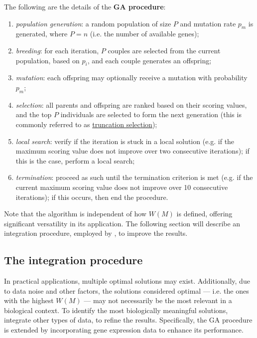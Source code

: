 \begin{definition}[GA procedure]
    The following are the details of the \textbf{GA procedure}:

    \begin{enumerate}
        \item \textit{population generation}: a random population of size $P$ and mutation rate $p_m$ is generated, where $P = n$ (i.e. the number of available genes);
        \item \textit{breeding}: for each iteration, $P$ couples are selected from the current population, based on $p_i$, and each couple generates an offspring;
        \item \textit{mutation}: each offspring may optionally receive a mutation with probability $p_m$;
        \item \textit{selection}: all parents and offspring are ranked based on their scoring values, and the top $P$ individuals are selected to form the next generation (this is commonly referred to as \href{https://en.wikipedia.org/wiki/Truncation_selection}{truncation selection});
        \item \textit{local search}: verify if the iteration is stuck in a local solution (e.g. if the maximum scoring value does not improve over two consecutive iterations); if this is the case, perform a local search;
        \item \textit{termination}: proceed as such until the termination criterion is met (e.g. if the current maximum scoring value does not improve over 10 consecutive iterations); if this occurs, then end the procedure.
    \end{enumerate}
\end{definition}

Note that the algorithm is independent of how $W(M)$ is defined, offering significant versatility in its application. The following section will describe an integration procedure, employed by \textcite{mdpfinder}, to improve the results.

\subsection{The integration procedure}

In practical applications, multiple optimal solutions may exist. Additionally, due to data noise and other factors, the solutions considered optimal --- i.e. the ones with the highest $W(M)$ --- may not necessarily be the most relevant in a biological context. To identify the most biologically meaningful solutions, \textcite{mdpfinder} integrate other types of data, to refine the results. Specifically, the GA procedure is extended by incorporating gene expression data to enhance its performance.

